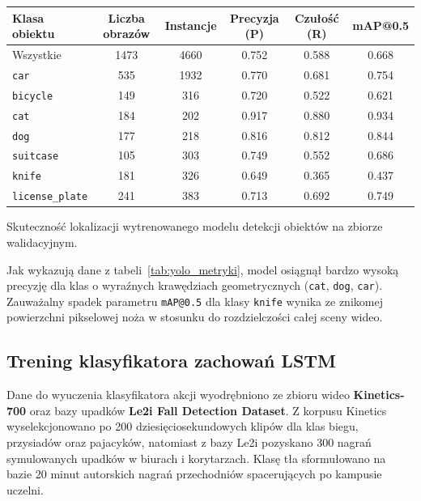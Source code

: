 \begin{table-}
    \centering
    \small
    \begin{tabular*}{\textwidth}{l @{\extracolsep{\fill}} S[table-format=4.0] S[table-format=4.0] S S S}
        \toprule
        \textbf{Klasa obiektu} & \textbf{Liczba obrazów} & \textbf{Instancje} & \textbf{Precyzja (P)} & \textbf{Czułość (R)} & \textbf{mAP@0.5} \\
        \midrule
        Wszystkie & 1473 & 4660 & 0.752 & 0.588 & 0.668 \\
        \texttt{car} & 535 & 1932 & 0.770 & 0.681 & 0.754 \\
        \texttt{bicycle} & 149 & 316 & 0.720 & 0.522 & 0.621 \\
        \texttt{cat} & 184 & 202 & 0.917 & 0.880 & 0.934 \\
        \texttt{dog} & 177 & 218 & 0.816 & 0.812 & 0.844 \\
        \texttt{suitcase} & 105 & 303 & 0.749 & 0.552 & 0.686 \\
        \texttt{knife} & 181 & 326 & 0.649 & 0.365 & 0.437 \\
        \texttt{license\_plate} & 241 & 383 & 0.713 & 0.692 & 0.749 \\
        \bottomrule
    \end{tabular*}
    \caption{Skuteczność lokalizacji wytrenowanego modelu detekcji obiektów na zbiorze walidacyjnym.}\label{tab:yolo_metryki}
\end{table-}

Jak wykazują dane z tabeli~\ref{tab:yolo_metryki}, model osiągnął bardzo wysoką precyzję dla klas o wyraźnych krawędziach geometrycznych (\texttt{cat}, \texttt{dog}, \texttt{car}). Zauważalny spadek parametru \texttt{mAP@0.5} dla klasy \texttt{knife} wynika ze znikomej powierzchni pikselowej noża w stosunku do rozdzielczości całej sceny wideo.

\subsection{Trening klasyfikatora zachowań LSTM}
Dane do wyuczenia klasyfikatora akcji wyodrębniono ze zbioru wideo \textbf{Kinetics-700} oraz bazy upadków \textbf{Le2i Fall Detection Dataset}. Z korpusu Kinetics wyselekcjonowano po 200 dziesięciosekundowych klipów dla klas biegu, przysiadów oraz pajacyków, natomiast z bazy Le2i pozyskano 300 nagrań symulowanych upadków w biurach i korytarzach. Klasę tła sformułowano na bazie 20 minut autorskich nagrań przechodniów spacerujących po kampusie uczelni.

